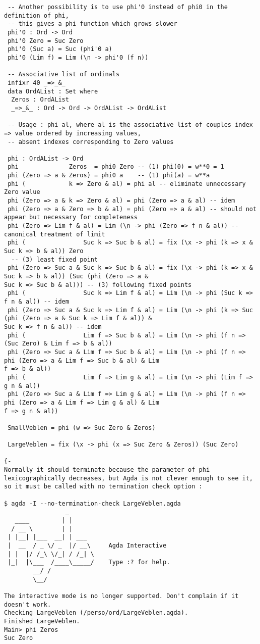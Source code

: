 \documentclass[10pt]{article}
\begin{document}
\begin{verbatim}
 -- Another possibility is to use phi'0 instead of phi0 in the definition of phi,
 -- this gives a phi function which grows slower
 phi'0 : Ord -> Ord
 phi'0 Zero = Suc Zero
 phi'0 (Suc a) = Suc (phi'0 a)
 phi'0 (Lim f) = Lim (\n -> phi'0 (f n))

 -- Associative list of ordinals
 infixr 40 _=>_&_
 data OrdAList : Set where
  Zeros : OrdAList
  _=>_&_ : Ord -> Ord -> OrdAList -> OrdAList

 -- Usage : phi al, where al is the associative list of couples index => value ordered by increasing values,
 -- absent indexes corresponding to Zero values

 phi : OrdAList -> Ord 
 phi              Zeros  = phi0 Zero -- (1) phi(0) = w**0 = 1 
 phi (Zero => a & Zeros) = phi0 a    -- (1) phi(a) = w**a
 phi (            k => Zero & al) = phi al -- eliminate unnecessary Zero value
 phi (Zero => a & k => Zero & al) = phi (Zero => a & al) -- idem
 phi (Zero => a & Zero => b & al) = phi (Zero => a & al) -- should not appear but necessary for completeness
 phi (Zero => Lim f & al) = Lim (\n -> phi (Zero => f n & al)) -- canonical treatment of limit
 phi (                Suc k => Suc b & al) = fix (\x -> phi (k => x & Suc k => b & al)) Zero 
  -- (3) least fixed point
 phi (Zero => Suc a & Suc k => Suc b & al) = fix (\x -> phi (k => x & Suc k => b & al)) (Suc (phi (Zero => a & 
Suc k => Suc b & al))) -- (3) following fixed points
 phi (                Suc k => Lim f & al) = Lim (\n -> phi (Suc k => f n & al)) -- idem 
 phi (Zero => Suc a & Suc k => Lim f & al) = Lim (\n -> phi (k => Suc (phi (Zero => a & Suc k => Lim f & al)) & 
Suc k => f n & al)) -- idem  
 phi (                Lim f => Suc b & al) = Lim (\n -> phi (f n => (Suc Zero) & Lim f => b & al)) 
 phi (Zero => Suc a & Lim f => Suc b & al) = Lim (\n -> phi (f n => phi (Zero => a & Lim f => Suc b & al) & Lim 
f => b & al))
 phi (                Lim f => Lim g & al) = Lim (\n -> phi (Lim f => g n & al))
 phi (Zero => Suc a & Lim f => Lim g & al) = Lim (\n -> phi (f n => phi (Zero => a & Lim f => Lim g & al) & Lim 
f => g n & al)) 

 SmallVeblen = phi (w => Suc Zero & Zeros)

 LargeVeblen = fix (\x -> phi (x => Suc Zero & Zeros)) (Suc Zero)

{-
Normally it should terminate because the parameter of phi lexicographically decreases, but Agda is not clever enough to see it, 
so it must be called with no termination check option :

$ agda -I --no-termination-check LargeVeblen.agda
                 _ 
   ____         | |
  / __ \        | |
 | |__| |___  __| | ___
 |  __  / _ \/ _  |/ __\     Agda Interactive
 | |  |/ /_\ \/_| / /_| \
 |_|  |\___  /____\_____/    Type :? for help.
        __/ /
        \__/

The interactive mode is no longer supported. Don't complain if it doesn't work.
Checking LargeVeblen (/perso/ord/LargeVeblen.agda).
Finished LargeVeblen.
Main> phi Zeros
Suc Zero

\end{verbatim}
\end{document}
